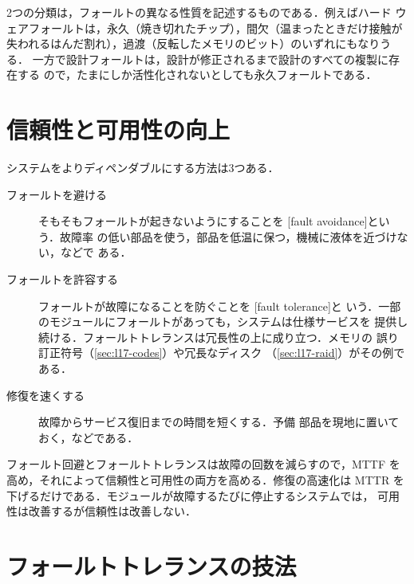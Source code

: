 \documentclass[../main.tex]{subfiles}
\begin{document}
2つの分類は，フォールトの異なる性質を記述するものである．例えばハード
ウェアフォールトは，永久（焼き切れたチップ），間欠（温まったときだけ接触が
失われるはんだ割れ），過渡（反転したメモリのビット）のいずれにもなりうる．
一方で設計フォールトは，設計が修正されるまで設計のすべての複製に存在する
ので，たまにしか活性化されないとしても永久フォールトである．

\section{信頼性と可用性の向上}
\label{sec:l17-improving}

システムをよりディペンダブルにする方法は3つある．

\begin{description}
  \item[フォールトを避ける] そもそもフォールトが起きないようにすることを
    [fault avoidance]という．故障率
    の低い部品を使う，部品を低温に保つ，機械に液体を近づけない，などで
    ある．
  \item[フォールトを許容する] フォールトが故障になることを防ぐことを
    [fault tolerance]と
    いう．一部のモジュールにフォールトがあっても，システムは仕様サービスを
    提供し続ける．フォールトトレランスは冗長性の上に成り立つ．メモリの
    誤り訂正符号（\cref{sec:l17-codes}）や冗長なディスク
    （\cref{sec:l17-raid}）がその例である．
  \item[修復を速くする] 故障からサービス復旧までの時間を短くする．予備
    部品を現地に置いておく，などである．
\end{description}

\begin{keypoint}
  フォールト回避とフォールトトレランスは故障の回数を減らすので，MTTF を
  高め，それによって信頼性と可用性の両方を高める．修復の高速化は MTTR を
  下げるだけである．モジュールが故障するたびに停止するシステムでは，
  可用性は改善するが信頼性は改善しない．
\end{keypoint}

\section{フォールトトレランスの技法}
\label{sec:l17-techniques}
\end{document}
